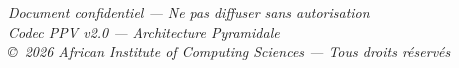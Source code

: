 \documentclass[12pt,a4paper]{article}
\theoremstyle{definition}
\begin{document}
	\vfill
	
	\begin{center}
		\textit{Document confidentiel — Ne pas diffuser sans autorisation} \\
		\textit{Codec PPV v2.0 — Architecture Pyramidale} \\
		\textit{\copyright~2026 African Institute of Computing Sciences — Tous droits réservés}
	\end{center}
	
\end{document}
